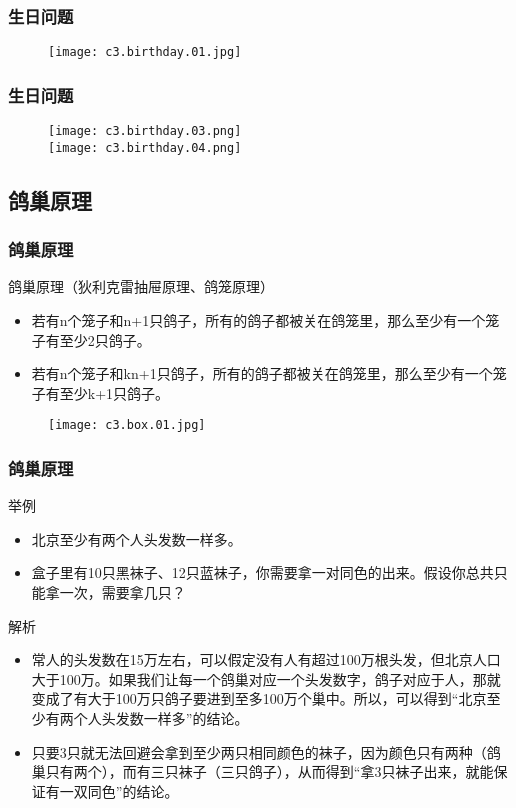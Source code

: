 \begin{frame}
  \frametitle{生日问题}
  \begin{figure}
    \centering
    \texttt{[image: c3.birthday.01.jpg]}
  \end{figure}
\end{frame}

\begin{frame}
  \frametitle{生日问题}
  \begin{figure}
    \centering
    \texttt{[image: c3.birthday.03.png]}\\
    \texttt{[image: c3.birthday.04.png]}
  \end{figure}
\end{frame}

\subsection{鸽巢原理}
\begin{frame}
  \frametitle{鸽巢原理}
  \begin{block}{鸽巢原理（狄利克雷抽屉原理、鸽笼原理）}
    \begin{itemize}
      \item 若有n个笼子和n+1只鸽子，所有的鸽子都被关在鸽笼里，那么至少有一个笼子有至少2只鸽子。
      \item 若有n个笼子和kn+1只鸽子，所有的鸽子都被关在鸽笼里，那么至少有一个笼子有至少k+1只鸽子。
    \end{itemize}
  \end{block}
  \vspace{-0.5em}
  \begin{figure}
    \centering
    \texttt{[image: c3.box.01.jpg]}
  \end{figure}
\end{frame}

\begin{frame}
  \frametitle{鸽巢原理}
  \begin{block}{举例}
    \begin{itemize}
      \item 北京至少有两个人头发数一样多。
      \item 盒子里有10只黑袜子、12只蓝袜子，你需要拿一对同色的出来。假设你总共只能拿一次，需要拿几只？
    \end{itemize}
  \end{block}
  \pause \pause \pause \pause
  \begin{block}{解析}
    \begin{itemize}
      \item 常人的头发数在15万左右，可以假定没有人有超过100万根头发，但北京人口大于100万。如果我们让每一个鸽巢对应一个头发数字，鸽子对应于人，那就变成了有大于100万只鸽子要进到至多100万个巢中。所以，可以得到“北京至少有两个人头发数一样多”的结论。
      \item 只要3只就无法回避会拿到至少两只相同颜色的袜子，因为颜色只有两种（鸽巢只有两个），而有三只袜子（三只鸽子），从而得到“拿3只袜子出来，就能保证有一双同色”的结论。
    \end{itemize}
  \end{block}
\end{frame}

